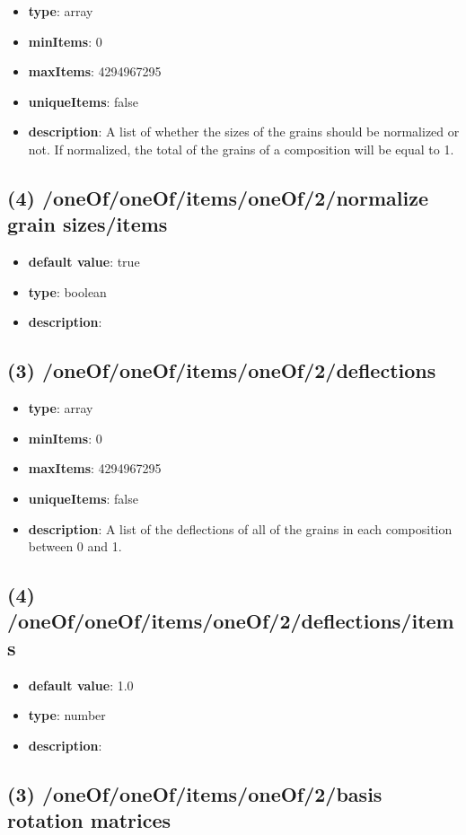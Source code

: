 \begin{itemize}[leftmargin=3em]\item {\bf type}: array
\item {\bf minItems}: 0
\item {\bf maxItems}: 4294967295
\item {\bf uniqueItems}: false
\item {\bf description}: A list of whether the sizes of the grains should be normalized or not. If normalized, the total of the grains of a composition will be equal to 1.
\end{itemize}\subsection{(4) /oneOf/oneOf/items/oneOf/2/normalize grain sizes/items}
\begin{itemize}[leftmargin=4em]\item {\bf default value}: true
\item {\bf type}: boolean
\item {\bf description}: 
\end{itemize}\subsection{(3) /oneOf/oneOf/items/oneOf/2/deflections}
\begin{itemize}[leftmargin=3em]\item {\bf type}: array
\item {\bf minItems}: 0
\item {\bf maxItems}: 4294967295
\item {\bf uniqueItems}: false
\item {\bf description}: A list of the deflections of all of the grains in each composition between 0 and 1.
\end{itemize}\subsection{(4) /oneOf/oneOf/items/oneOf/2/deflections/items}
\begin{itemize}[leftmargin=4em]\item {\bf default value}: 1.0
\item {\bf type}: number
\item {\bf description}: 
\end{itemize}\subsection{(3) /oneOf/oneOf/items/oneOf/2/basis rotation matrices}
